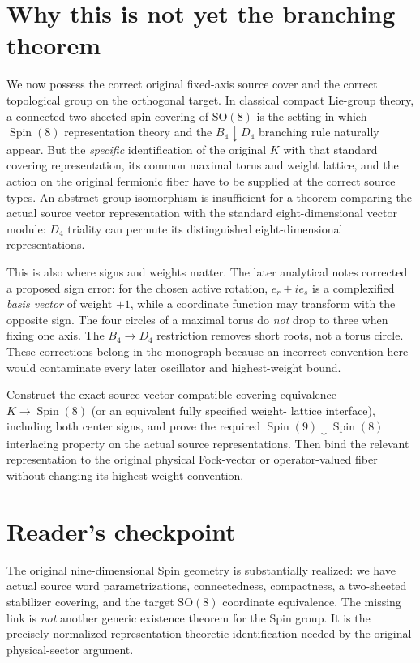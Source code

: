 \section{Why this is not yet the branching theorem}
We now possess the correct original fixed-axis source cover and the
correct topological group on the orthogonal target. In classical compact
Lie-group theory, a connected two-sheeted spin covering of $\mathrm{SO}(8)$
is the setting in which $\operatorname{Spin}(8)$ representation theory
and the $B_4\downarrow D_4$ branching rule naturally appear. But the
\emph{specific} identification of the original $K$ with that standard
covering representation, its common maximal torus and weight lattice,
and the action on the original fermionic fiber have to be supplied at the
correct source types. An abstract group isomorphism is insufficient for
a theorem comparing the actual source vector representation with the
standard eight-dimensional vector module: $D_4$ triality can permute
its distinguished eight-dimensional representations.

This is also where signs and weights matter. The later analytical notes
corrected a proposed sign error: for the chosen active rotation,
$e_r+i e_s$ is a complexified \emph{basis vector} of weight $+1$,
while a coordinate function may transform with the opposite sign.
The four circles of a maximal torus do \emph{not} drop to three when
fixing one axis. The $B_4\to D_4$ restriction removes short roots,
not a torus circle. These corrections belong in the monograph because
an incorrect convention here would contaminate every later oscillator
and highest-weight bound.

\begin{openproblem}
Construct the exact source vector-compatible covering equivalence
$K\to\operatorname{Spin}(8)$ (or an equivalent fully specified weight-
lattice interface), including both center signs, and prove the required
$\operatorname{Spin}(9)\downarrow\operatorname{Spin}(8)$ interlacing
property on the actual source representations. Then bind the relevant
representation to the original physical Fock-vector or operator-valued
fiber without changing its highest-weight convention.
\end{openproblem}

\section{Reader's checkpoint}
The original nine-dimensional Spin geometry is substantially realized:
we have actual source word parametrizations, connectedness, compactness,
a two-sheeted stabilizer covering, and the target $\mathrm{SO}(8)$
coordinate equivalence. The missing link is \emph{not} another generic
existence theorem for the Spin group. It is the precisely normalized
representation-theoretic identification needed by the original
physical-sector argument.

